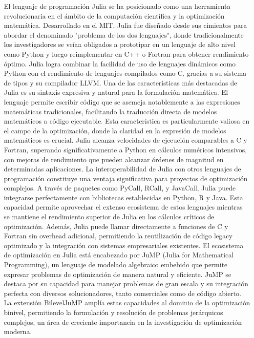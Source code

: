 El lenguaje de programación Julia se ha posicionado como una herramienta revolucionaria en el ámbito de la computación científica y la optimización matemática. Desarrollado en el MIT, Julia fue diseñado desde sus cimientos para abordar el denominado "problema de los dos lenguajes", donde tradicionalmente los investigadores se veían obligados a prototipar en un lenguaje de alto nivel como Python y luego reimplementar en C++ o Fortran para obtener rendimiento óptimo. Julia logra combinar la facilidad de uso de lenguajes dinámicos como Python con el rendimiento de lenguajes compilados como C, gracias a su sistema de tipos y su compilador LLVM.
Una de las características más destacadas de Julia es su sintaxis expresiva y natural para la formulación matemática. El lenguaje permite escribir código que se asemeja notablemente a las expresiones matemáticas tradicionales, facilitando la traducción directa de modelos matemáticos a código ejecutable. Esta característica es particularmente valiosa en el campo de la optimización, donde la claridad en la expresión de modelos matemáticos es crucial. Julia alcanza velocidades de ejecución comparables a C y Fortran, superando significativamente a Python en cálculos numéricos intensivos, con mejoras de rendimiento que pueden alcanzar órdenes de magnitud en determinadas aplicaciones.
La interoperabilidad de Julia con otros lenguajes de programación constituye una ventaja significativa para proyectos de optimización complejos. A través de paquetes como PyCall, RCall, y JavaCall, Julia puede integrarse perfectamente con bibliotecas establecidas en Python, R y Java. Esta capacidad permite aprovechar el extenso ecosistema de estos lenguajes mientras se mantiene el rendimiento superior de Julia en los cálculos críticos de optimización. Además, Julia puede llamar directamente a funciones de C y Fortran sin overhead adicional, permitiendo la reutilización de código legacy optimizado y la integración con sistemas empresariales existentes.
El ecosistema de optimización en Julia está encabezado por JuMP (Julia for Mathematical Programming), un lenguaje de modelado algebraico embebido que permite expresar problemas de optimización de manera natural y eficiente. JuMP se destaca por su capacidad para manejar problemas de gran escala y su integración perfecta con diversos solucionadores, tanto comerciales como de código abierto. La extensión BilevelJuMP amplía estas capacidades al dominio de la optimización binivel, permitiendo la formulación y resolución de problemas jerárquicos complejos, un área de creciente importancia en la investigación de optimización moderna.


